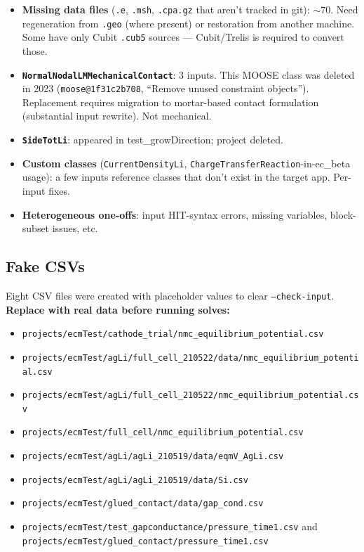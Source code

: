 \documentclass[11pt,letterpaper]{article}
\newenvironment{tightitemize}{\begin{itemize}\setlength\itemsep{0pt}\setlength\parsep{0pt}}{\end{itemize}}
\newcommand{\code}[1]{\texttt{\small #1}}
\begin{document}
\begin{tightitemize}
  \item \textbf{Missing data files} (\code{.e}, \code{.msh}, \code{.cpa.gz} that aren't tracked in git): ${\sim}70$.
    Need regeneration from \code{.geo} (where present) or restoration from another machine.
    Some have only Cubit \code{.cub5} sources --- Cubit/Trelis is required to convert those.
  \item \textbf{\code{NormalNodalLMMechanicalContact}}: 3 inputs.
    This MOOSE class was deleted in 2023 (\code{moose@1f31c2b708}, ``Remove unused
    constraint objects''). Replacement requires migration to mortar-based contact
    formulation (substantial input rewrite). Not mechanical.
  \item \textbf{\code{SideTotLi}}: appeared in test\_growDirection; project deleted.
  \item \textbf{Custom classes} (\code{CurrentDensityLi}, \code{ChargeTransferReaction}-in-ec\_beta usage):
    a few inputs reference classes that don't exist in the target app. Per-input fixes.
  \item \textbf{Heterogeneous one-offs}: input HIT-syntax errors, missing variables, block-subset issues, etc.
\end{tightitemize}

\subsection{Fake CSVs}

Eight CSV files were created with placeholder values to clear \code{--check-input}.
\textbf{Replace with real data before running solves:}

\begin{tightitemize}
  \item \code{projects/ecmTest/cathode\_trial/nmc\_equilibrium\_potential.csv}
  \item \code{projects/ecmTest/agLi/full\_cell\_210522/data/nmc\_equilibrium\_potential.csv}
  \item \code{projects/ecmTest/agLi/full\_cell\_210522/nmc\_equilibrium\_potential.csv}
  \item \code{projects/ecmTest/full\_cell/nmc\_equilibrium\_potential.csv}
  \item \code{projects/ecmTest/agLi/agLi\_210519/data/eqmV\_AgLi.csv}
  \item \code{projects/ecmTest/agLi/agLi\_210519/data/Si.csv}
  \item \code{projects/ecmTest/glued\_contact/data/gap\_cond.csv}
  \item \code{projects/ecmTest/test\_gapconductance/pressure\_time1.csv} and \code{projects/ecmTest/glued\_contact/pressure\_time1.csv}
\end{tightitemize}
\end{document}
